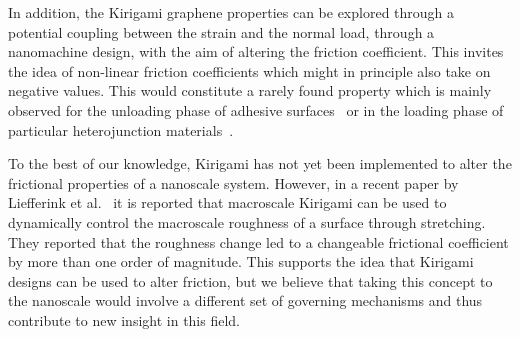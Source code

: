 In addition, the Kirigami graphene properties can be explored through a
potential coupling between the strain and the normal load, through a
nanomachine design, with the aim of altering the friction coefficient. This
invites the idea of non-linear friction coefficients which might in principle also
take on negative values. This would constitute a rarely found property which is mainly observed for the unloading phase of adhesive
surfaces~\cite{deng_adhesion-dependent_2012} or in the loading phase of particular
heterojunction materials~\cite{Liu_2020, Mandelli_2019}.

To the best of our knowledge, Kirigami has not yet been implemented to alter the
frictional properties of a nanoscale system. However, in a recent paper by
Liefferink et al.~\cite{LIEFFERINK2021101475} it is reported that macroscale
Kirigami can be used to dynamically control the macroscale roughness of a
surface through stretching. They reported that the roughness change led to a
changeable frictional coefficient by more than one order of magnitude. This
supports the idea that Kirigami designs can be used to alter friction, but we
believe that taking this concept to the nanoscale would involve a different set
of governing mechanisms and thus contribute to new insight in this field.











